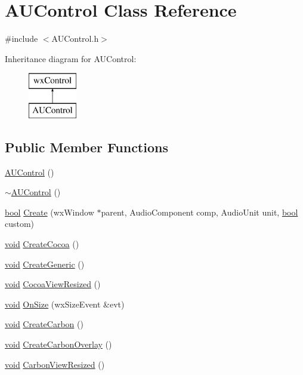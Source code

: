 \hypertarget{class_a_u_control}{}\section{A\+U\+Control Class Reference}
\label{class_a_u_control}


{\ttfamily \#include $<$A\+U\+Control.\+h$>$}

Inheritance diagram for A\+U\+Control\+:\begin{figure}[H]
\begin{center}
\leavevmode
\includegraphics[height=2.000000cm]{class_a_u_control}
\end{center}
\end{figure}
\subsection*{Public Member Functions}
\begin{DoxyCompactItemize}
\item 
\hyperlink{class_a_u_control_a53166a1ff8c733d7b0cdf7e26ff6c377}{A\+U\+Control} ()
\item 
\hyperlink{class_a_u_control_ae92cead05a5a4d166c0aede5e3db29ac}{$\sim$\+A\+U\+Control} ()
\item 
\hyperlink{mac_2config_2i386_2lib-src_2libsoxr_2soxr-config_8h_abb452686968e48b67397da5f97445f5b}{bool} \hyperlink{class_a_u_control_a73b68cd32f79194bb01db27474307e8c}{Create} (wx\+Window $\ast$parent, Audio\+Component comp, Audio\+Unit unit, \hyperlink{mac_2config_2i386_2lib-src_2libsoxr_2soxr-config_8h_abb452686968e48b67397da5f97445f5b}{bool} custom)
\item 
\hyperlink{sound_8c_ae35f5844602719cf66324f4de2a658b3}{void} \hyperlink{class_a_u_control_a9bb5aa5d3a6e32533c933100c2b3a394}{Create\+Cocoa} ()
\item 
\hyperlink{sound_8c_ae35f5844602719cf66324f4de2a658b3}{void} \hyperlink{class_a_u_control_a532197e2fc079e33d99a0fa3020eb1c7}{Create\+Generic} ()
\item 
\hyperlink{sound_8c_ae35f5844602719cf66324f4de2a658b3}{void} \hyperlink{class_a_u_control_a94fbafde6ae2b9c3eef9eb3777adfd58}{Cocoa\+View\+Resized} ()
\item 
\hyperlink{sound_8c_ae35f5844602719cf66324f4de2a658b3}{void} \hyperlink{class_a_u_control_a7418c867e945e3595bcc350242960050}{On\+Size} (wx\+Size\+Event \&evt)
\item 
\hyperlink{sound_8c_ae35f5844602719cf66324f4de2a658b3}{void} \hyperlink{class_a_u_control_a8a8e7fb729306f129528460e8a3817a8}{Create\+Carbon} ()
\item 
\hyperlink{sound_8c_ae35f5844602719cf66324f4de2a658b3}{void} \hyperlink{class_a_u_control_adb85c8b3928c815d9f9b8200000f3f6c}{Create\+Carbon\+Overlay} ()
\item 
\hyperlink{sound_8c_ae35f5844602719cf66324f4de2a658b3}{void} \hyperlink{class_a_u_control_aef7a4738329a35fbc6a9a418cb1edf1d}{Carbon\+View\+Resized} ()
\end{DoxyCompactItemize}
